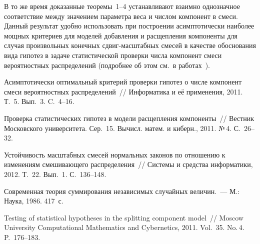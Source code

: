 \begin{multicols}{2}
В то же время доказанные
теоремы~1--4 уста\-нав\-ли\-ва\-ют
взаимно однозначное соответствие между значением параметра веса и
числом компонент в смеси. Данный результат удобно использовать при
построении асимптотически наиболее мощных критериев для моделей
добавления и расщепления компоненты для случая произвольных
конечных сдвиг-мас\-штаб\-ных смесей в качестве обоснования вида гипотез
в задаче статистической проверки чис\-ла компонент смеси вероятностных
распределений (подробнее об этом см.\ в
работах~\cite{Gorshenin2011, Gorshenin2011MUCMC}).

{\small\frenchspacing
{%
\begin{thebibliography}{9}


Асимптотически оптимальный критерий проверки гипотез о числе
компонент смеси вероятностных распределений~// Информатика и её
применения, 2011. Т.~5. Вып.~3. C.~4--16.

Проверка статистических гипотез в модели расщепления компоненты~//
Вестник Московского университета. Сер.~15. Вычисл. матем. и киберн.,
2011. №\,4. С.~26--32.

 
Устойчивость масштабных смесей нормальных законов по отношению к
изменениям смешивающего распределения~// Системы и средства
информатики, 2012. Т.~22. Вып.~1. С.~136--148.

 Современная теория
суммирования независимых случайных величин.~--- М.: Наука, 1986. 417~с.

\label{end\stat}

Testing of statistical hypotheses in the splitting component
model~// Moscow University Computational Mathematics and
Cybernetics, 2011. Vol.~35. No.\,4. P.~176--183.
 \end{thebibliography}
}
}


\end{multicols}